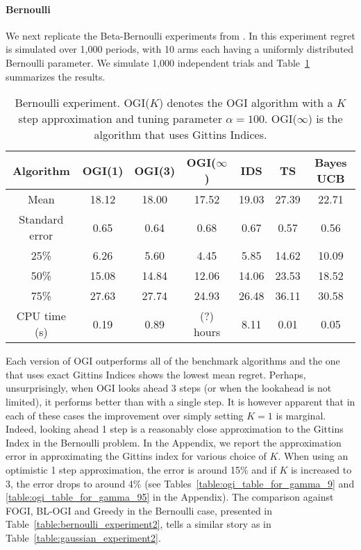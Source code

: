 \paragraph{Bernoulli}
We next replicate the Beta-Bernoulli experiments from \cite{russo2014learning}.
In this experiment regret is simulated over 1,000 periods, with 10 arms each having a uniformly distributed Bernoulli parameter. We simulate 1,000 independent trials and Table~\ref{table:bernoulli_experiment1} summarizes the results.


\begin{table}[h!]
	\centering
	\begin{tabular}{ccccccc} \toprule
		\textbf{Algorithm} & \textbf{OGI(1)} & \textbf{OGI(3)} &  \textbf{OGI($\infty$)} & \textbf{IDS} & \textbf{TS} & \textbf{Bayes UCB}  \\ \midrule
		Mean &  18.12 & 18.00 & 17.52 & 19.03 & 27.39 & 22.71 \\ 
		Standard error & 0.65 & 0.64 &  0.68 & 0.67 & 0.57 & 0.56 \\ 
		25\% & 6.26 & 5.60 & 4.45 & 5.85 & 14.62 & 10.09 \\
		50\% & 15.08 & 14.84 &12.06 & 14.06 & 23.53 & 18.52 \\
		75\% & 27.63 & 27.74 & 24.93 & 26.48 & 36.11 & 30.58 \\
		CPU time (s) & 0.19 & 0.89 & (?) hours & 8.11 & 0.01 & 0.05  \\ \bottomrule
	\end{tabular}
	\caption[Table caption text]{Bernoulli experiment. OGI($K$) denotes the OGI algorithm with a $K$ step approximation and tuning parameter $\alpha = 100$. OGI($\infty$) is the algorithm that uses Gittins Indices.}
	\label{table:bernoulli_experiment1}
\end{table}

Each version of OGI outperforms {\color{blue}all of the benchmark} algorithms and the one that uses exact Gittins Indices shows the lowest mean regret.
Perhaps, unsurprisingly, when OGI  looks ahead 3 steps (or when the lookahead is not limited), it performs better than with a single step. It is however apparent that in each of these cases the improvement over simply setting $K=1$ is marginal. Indeed, looking ahead 1 step is a reasonably close approximation to the Gittins Index in the Bernoulli problem. In the Appendix, we report the approximation error in approximating the Gittins index for various choice of $K$. When using an optimistic 1 step approximation, the error is around 15\% and if $K$ is increased to 3, the error drops to around 4\% (see Tables~\ref{table:ogi_table_for_gamma_9} and \ref{table:ogi_table_for_gamma_95} in the Appendix). {\color{blue} The comparison against FOGI, BL-OGI and Greedy in the Bernoulli case, presented in Table~\ref{table:bernoulli_experiment2}, tells a similar story as in Table~\ref{table:gaussian_experiment2}.
}

